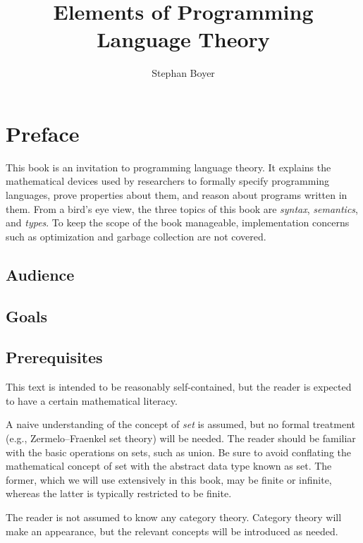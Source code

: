 \documentclass[oneside]{book}
\title{Elements of Programming Language Theory}
\author{Stephan Boyer}
\date{}
\begin{document}
  

  \frontmatter

  \maketitle

  \chapter{Preface}

    This book is an invitation to programming language theory. It explains the mathematical devices used by researchers to formally specify programming languages, prove properties about them, and reason about programs written in them. From a bird's eye view, the three topics of this book are \emph{syntax}, \emph{semantics}, and \emph{types}. To keep the scope of the book manageable, implementation concerns such as optimization and garbage collection are not covered.

    \section*{Audience}

    \section*{Goals}

    \section*{Prerequisites}

      This text is intended to be reasonably self-contained, but the reader is expected to have a certain mathematical literacy.

      A naive understanding of the concept of \emph{set} is assumed, but no formal treatment (e.g., Zermelo--Fraenkel set theory) will be needed. The reader should be familiar with the basic operations on sets, such as union. Be sure to avoid conflating the mathematical concept of set with the abstract data type known as set. The former, which we will use extensively in this book, may be finite or infinite, whereas the latter is typically restricted to be finite.

      The reader is not assumed to know any category theory. Category theory will make an appearance, but the relevant concepts will be introduced as needed.
\end{document}

